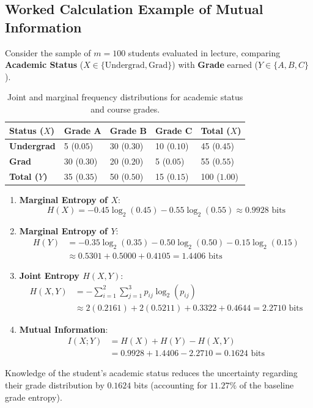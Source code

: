 \subsection{Worked Calculation Example of Mutual Information}
Consider the sample of $m = 100$ students evaluated in lecture, comparing \textbf{Academic Status} ($X \in \{\text{Undergrad}, \text{Grad}\}$) with \textbf{Grade} earned ($Y \in \{A, B, C\}$).

\begin{table}[htbp]
\centering
\small
\begin{tabularx}{\textwidth}{lYYYY}
\toprule
\textbf{Status ($X$)} & \textbf{Grade A} & \textbf{Grade B} & \textbf{Grade C} & \textbf{Total ($X$)} \\
\midrule
\textbf{Undergrad} & 5 ($0.05$) & 30 ($0.30$) & 10 ($0.10$) & 45 ($0.45$) \\
\textbf{Grad} & 30 ($0.30$) & 20 ($0.20$) & 5 ($0.05$) & 55 ($0.55$) \\
\midrule
\textbf{Total ($Y$)} & 35 ($0.35$) & 50 ($0.50$) & 15 ($0.15$) & 100 ($1.00$) \\
\bottomrule
\end{tabularx}
\caption{Joint and marginal frequency distributions for academic status and course grades.}
\label{tab:dm-student-contingency}
\end{table}

\begin{enumerate}
    \item \textbf{Marginal Entropy of $X$}:
    \begin{equation}
        H(X) = - 0.45 \log_2(0.45) - 0.55 \log_2(0.55) \approx 0.9928 \text{ bits}
    \end{equation}
    \item \textbf{Marginal Entropy of $Y$}:
    \begin{align}
        H(Y) &= - 0.35 \log_2(0.35) - 0.50 \log_2(0.50) - 0.15 \log_2(0.15) \nonumber \\
        &\approx 0.5301 + 0.5000 + 0.4105 = 1.4406 \text{ bits}
    \end{align}
    \item \textbf{Joint Entropy $H(X, Y)$}:
    \begin{align}
        H(X, Y) &= - \sum_{i=1}^2 \sum_{j=1}^3 p_{ij} \log_2(p_{ij}) \nonumber \\
        &\approx 2(0.2161) + 2(0.5211) + 0.3322 + 0.4644 = 2.2710 \text{ bits}
    \end{align}
    \item \textbf{Mutual Information}:
    \begin{align}
        I(X; Y) &= H(X) + H(Y) - H(X, Y) \nonumber \\
        &= 0.9928 + 1.4406 - 2.2710 = 0.1624 \text{ bits}
    \end{align}
\end{enumerate}
Knowledge of the student's academic status reduces the uncertainty regarding their grade distribution by $0.1624$ bits (accounting for $11.27\%$ of the baseline grade entropy).

